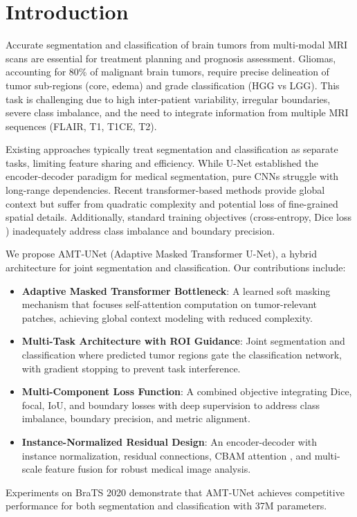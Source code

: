 \section{Introduction}

Accurate segmentation and classification of brain tumors from multi-modal MRI scans are essential for treatment planning and prognosis assessment. Gliomas, accounting for 80\% of malignant brain tumors, require precise delineation of tumor sub-regions (core, edema) and grade classification (HGG vs LGG). This task is challenging due to high inter-patient variability, irregular boundaries, severe class imbalance, and the need to integrate information from multiple MRI sequences (FLAIR, T1, T1CE, T2).

Existing approaches typically treat segmentation and classification as separate tasks, limiting feature sharing and efficiency. While U-Net \cite{ronneberger2015unet} established the encoder-decoder paradigm for medical segmentation, pure CNNs struggle with long-range dependencies. Recent transformer-based methods \cite{dosovitskiy2020image,chen2021transunet} provide global context but suffer from quadratic complexity and potential loss of fine-grained spatial details. Additionally, standard training objectives (cross-entropy, Dice loss \cite{milletari2016vnet}) inadequately address class imbalance and boundary precision.

We propose AMT-UNet (Adaptive Masked Transformer U-Net), a hybrid architecture for joint segmentation and classification. Our contributions include:

\begin{itemize}
\item \textbf{Adaptive Masked Transformer Bottleneck}: A learned soft masking mechanism that focuses self-attention computation on tumor-relevant patches, achieving global context modeling with reduced complexity.

\item \textbf{Multi-Task Architecture with ROI Guidance}: Joint segmentation and classification where predicted tumor regions gate the classification network, with gradient stopping to prevent task interference.

\item \textbf{Multi-Component Loss Function}: A combined objective integrating Dice, focal, IoU, and boundary losses with deep supervision to address class imbalance, boundary precision, and metric alignment.

\item \textbf{Instance-Normalized Residual Design}: An encoder-decoder with instance normalization, residual connections, CBAM attention \cite{woo2018cbam}, and multi-scale feature fusion for robust medical image analysis.
\end{itemize}

Experiments on BraTS 2020 demonstrate that AMT-UNet achieves competitive performance for both segmentation and classification with 37M parameters.
